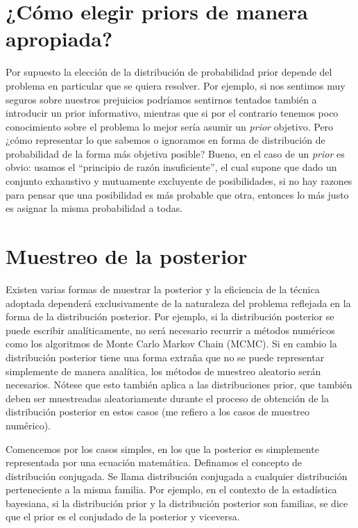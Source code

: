 \documentclass[a4paper,twoside]{article}
\begin{document}
\section{¿Cómo elegir priors de manera apropiada?}
%
Por supuesto la elección de la distribución de probabilidad prior depende del problema en particular
que se quiera resolver. Por ejemplo, si nos sentimos muy seguros sobre nuestros prejuicios podríamos
sentirnos tentados también a introducir un prior informativo, mientras que si por el contrario
tenemos poco conocimiento sobre el problema lo mejor sería asumir un \emph{prior} objetivo. Pero
¿cómo representar lo que sabemos o ignoramos en forma de distribución de probabilidad de la forma
más objetiva posible? Bueno, en el caso de un \emph{prior} es obvio: usamos el ``principio de razón
insuficiente'', el cual supone que dado un conjunto exhaustivo y mutuamente excluyente de
posibilidades, si no hay razones para pensar que una posibilidad es más probable que otra, entonces
lo más justo es asignar la misma probabilidad a todas.


\section{Muestreo de la posterior}
%
Existen varias formas de muestrar la posterior y la eficiencia de la técnica adoptada dependerá
exclusivamente de la naturaleza del problema reflejada en la forma de la distribución posterior. Por
ejemplo, si la distribución posterior se puede escribir analíticamente, no será necesario recurrir a
métodos numéricos como los algoritmos de Monte Carlo Markov Chain (MCMC). Si en cambio la
distribución posterior tiene una forma extraña que no se puede representar simplemente de manera
analítica, los métodos de muestreo aleatorio serán necesarios. Nótese que esto también aplica a las
distribuciones prior, que también deben ser muestreadas aleatoriamente durante el proceso de
obtención de la distribución posterior en estos casos (me refiero a los casos de muestreo numérico).

Comencemos por los casos simples, en los que la posterior es simplemente representada por una
ecuación matemática. Definamos el concepto de distribución conjugada. Se llama distribución
conjugada a cualquier distribución perteneciente a la misma familia. Por ejemplo, en el contexto de
la estadística bayesiana, si la distribución prior y la distribución posterior son familias, se dice
que el prior es el conjudado de la posterior y viceversa.
\end{document}

